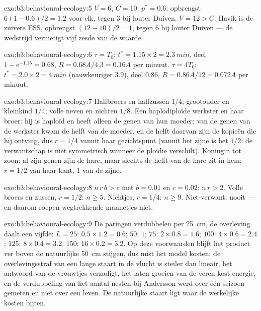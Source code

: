 \begin{solution}{exo:b3:behavioural-ecology:5}
$V = 6$, $C = 10$: $p^{*} = 0.6$; opbrengst $6(1 - 0.6)/2 = 1.2$ voor
elk, tegen $3$ bij louter Duiven. $V = 12 > C$: Havik is de zuivere
ESS, opbrengst $(12 - 10)/2 = 1$, tegen $6$ bij louter Duiven --- de
wedstrijd vernietigt vijf zesde van de waarde.
\end{solution}

\begin{solution}{exo:b3:behavioural-ecology:6}
$\tau = T_{0}$: $t^{*} = 1.15\times 2 = \qty{2.3}{min}$, deel $1 -
\mathrm{e}^{-1.15} = 0.68$, $R = 0.68A/4.3 = 0.16A$ per minuut. $\tau =
4T_{0}$: $t^{*} = 2.0\times 2 = \qty{4}{min}$ (nauwkeuriger $3.9$),
deel $0.86$, $R = 0.86A/12 = 0.072A$ per minuut.
\end{solution}

\begin{solution}{exo:b3:behavioural-ecology:7}
Halfbroers en halfzussen $1/4$; grootouder en kleinkind $1/4$; volle
neven en nichten $1/8$. Een haplodiploïde werkster en haar broer: hij
is haploïd en heeft alleen de genen van hun moeder; van de genen van de
werkster kwam de helft van de moeder, en de helft daarvan zijn de
kopieën die hij ontving, dus $r = 1/4$ vanuit haar gezichtspunt (vanuit
het zijne is het $1/2$: de verwantschap is niet symmetrisch wanneer de
ploïdie verschilt). Koningin tot zoon: al zijn genen zijn de hare, maar
slechts de helft van de hare zit in hem: $r = 1/2$ van haar kant, $1$
van de zijne.
\end{solution}

\begin{solution}{exo:b3:behavioural-ecology:8}
$n\,r\,b > c$ met $b = 0.01$ en $c = 0.02$: $n\,r > 2$. Volle broers en
zussen, $r
= 1/2$: $n \ge 5$. Nichtjes, $r = 1/4$: $n \ge 9$. Niet-verwant: nooit
--- en daarom roepen wegtrekkende mannetjes niet.
\end{solution}

\begin{solution}{exo:b3:behavioural-ecology:9}
De paringen verdubbelen per \qty{25}{cm}, de overleving daalt een
vijfde: $L = 25$: $0.5\times 1.2 = 0.6$; $50$: $1$; $75$: $2\times 0.8 = 1.6$;
$100$: $4\times 0.6 = 2.4$; $125$: $8\times 0.4 = 3.2$; $150$: $16\times 0.2 =
3.2$. Op deze voorwaarden blijft het product ver boven
de natuurlijke \qty{50}{cm} stijgen, dus mist het model kosten: de
overlevingsstraf van een lange staart in de vlucht is steiler dan
lineair, het antwoord van de vrouwtjes verzadigt, het laten groeien van
de veren kost energie, en de verdubbeling van het aantal nesten bij
Andersson werd over één seizoen gemeten en niet over een leven. De
natuurlijke staart ligt waar de werkelijke kosten bijten.
\end{solution}

